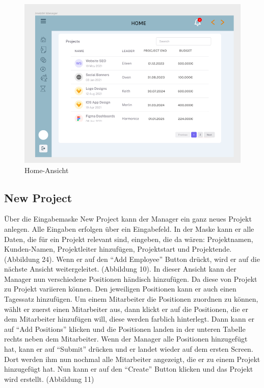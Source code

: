 \documentclass{article}
\begin{document}
         \begin{figure}[h]
            \includegraphics[height= 0.5\textwidth,width= \textwidth]{images/Home.png}
            \caption{Home-Ansicht}
            \label{fig:beispiel}
        \end{figure}

\newpage
\subsection{New Project}
Über die Eingabemaske New Project kann der Manager ein ganz neues Projekt anlegen. Alle Eingaben erfolgen über ein Eingabefeld. In der Maske kann er alle Daten, die für ein Projekt relevant sind, eingeben, die da wären: Projektnamen, Kunden-Namen, Projektleiter hinzufügen, Projektstart und  Projektende. (Abbildung 24). Wenn er auf den “Add Employee” Button drückt, wird er auf die nächste Ansicht weitergeleitet. (Abbildung 10). In dieser Ansicht kann der Manager nun verschiedene Positionen händisch hinzufügen. Da diese von Projekt zu Projekt variieren können. Den jeweiligen Positionen kann er auch einen Tagessatz hinzufügen. Um einem Mitarbeiter die Positionen zuordnen zu können, wählt er zuerst einen Mitarbeiter aus, dann klickt er auf die Positionen, die er dem Mitarbeiter hinzufügen will, diese werden farblich hinterlegt. Dann kann er auf “Add Positions” klicken und die Positionen landen in der unteren Tabelle rechts neben dem Mitarbeiter. Wenn der Manager alle Positionen hinzugefügt hat, kann er auf “Submit” drücken und er landet wieder auf dem ersten Screen. Dort werden ihm nun nochmal alle Mitarbeiter angezeigt, die er zu einem Projekt hinzugefügt hat. Nun kann er auf den “Create” Button klicken und das Projekt wird erstellt. (Abbildung 11)
\end{document}
